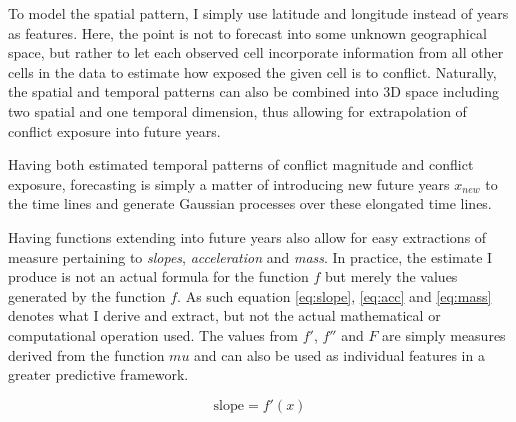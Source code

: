 \documentclass[a4paper]{article}
\begin{document}
To model the spatial pattern, I simply use latitude and longitude instead of years as features. Here, the point is not to forecast into some unknown geographical space, but rather to let each observed cell incorporate information from all other cells in the data to estimate how exposed the given cell is to conflict. Naturally, the spatial and temporal patterns can also be combined into 3D space including two spatial and one temporal dimension, thus allowing for extrapolation of conflict exposure into future years.\par

Having both estimated temporal patterns of conflict magnitude and conflict exposure, forecasting is simply a matter of introducing new future years $x_{new}$ to the time lines and generate Gaussian processes over these elongated time lines.\par 


Having functions extending into future years also allow for easy extractions of measure pertaining to \emph{slopes}, \emph{acceleration} and \emph{mass}. In practice, the estimate I produce is not an actual formula for the function $f$ but merely the values generated by the function $f$. As such equation \ref{eq:slope}, \ref{eq:acc} and \ref{eq:mass} denotes what I derive and extract, but not the actual mathematical or computational operation used. The values from $f'$, $f''$ and $F$ are simply measures derived from the function $mu$ and can also be used as individual features in a greater predictive framework.\par 


\[
\text{slope} = f'(x)   \tag{11}  \label{eq:slope}
\]
\end{document}
